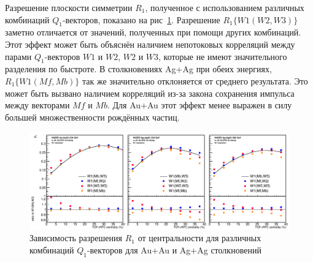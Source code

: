 Разрешение плоскости симметрии $R_1$, полученное с использованием различных комбинаций $Q_1$-векторов, показано на рис~\ref{fig:hades_w1_combinations}.
Разрешение $R_1\{W1(W2,W3)\}$ заметно отличается от значений, полученных при помощи других комбинаций. 
Этот эффект может быть объяснён наличием непотоковых корреляций между парами $Q_1$-векторов $W1$ и $W2$, $W2$ и $W3$, которые не имеют значительного разделения по быстроте. 
В столкновениях Ag+Ag при обеих энергиях, $R_1\{W1(Mf,Mb)\}$ так же значительно отклоняется от среднего результата. 
Это может быть вызвано наличием корреляций из-за закона сохранения импульса между векторами $Mf$ и $Mb$. 
Для  Au+Au этот эффект менее выражен в силу большей множественности рождённых частиц.

\begin{figure}[h]
\begin{center}
\includegraphics[width=0.75\linewidth]{images/W1_combinations.png}
\caption{Зависимость  разрешения $R_1$ от центральности для различных комбинаций $Q_1$-векторов
  для Au+Au и  Ag+Ag столкновений}
\label{fig:hades_w1_combinations}
\end{center}
\end{figure}

